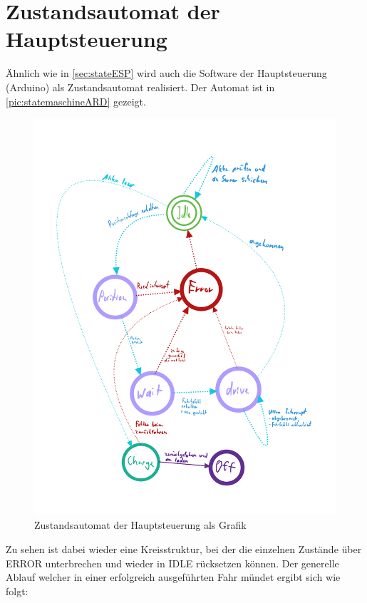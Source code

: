 \section{Zustandsautomat der Hauptsteuerung}
\label{sec:stateARD}
Ähnlich wie in \autoref{sec:stateESP} wird auch die Software der Hauptsteuerung (Arduino) als Zustandsautomat realisiert. 
Der Automat ist in \autoref{pic:statemaschineARD} gezeigt.

\begin{figure}[h]
	\begin{center}
		\includegraphics[width=14cm]{stateMaschineARD.pdf}
		\caption{\label{pic:statemaschineARD}Zustandsautomat der Hauptsteuerung als Grafik}
	\end{center}
\end{figure}

Zu sehen ist dabei wieder eine Kreisstruktur, bei der die einzelnen Zustände über ERROR unterbrechen und wieder in IDLE rücksetzen können. Der generelle Ablauf welcher in einer erfolgreich ausgeführten Fahr mündet ergibt sich wie folgt:

